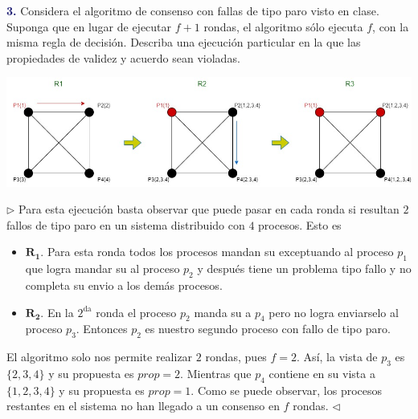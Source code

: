 \textbf{\textcolor{MidnightBlue}{3.}} Considera el algoritmo de consenso con
fallas de tipo paro visto en clase. Suponga que en lugar de ejecutar $f + 1$
rondas, el algoritmo sólo ejecuta $f$, con la misma regla de decisión. Describa
una ejecución particular en la que las propiedades de validez y acuerdo sean violadas.
\newline

\begin{center}
    \includegraphics[scale=0.5]{Consenso.jpeg}
    \end{center}

$\rhd$ Para esta ejecución basta observar que puede pasar en cada
ronda si resultan $2$ fallos de tipo paro en un sistema distribuido
con $4$ procesos. Esto es
\begin{itemize}
\item $\mathbf{R_1}.$ Para esta ronda todos los procesos mandan su 
      exceptuando al proceso $p_1$ que logra mandar su  al proceso
      $p_2$ y después tiene un problema tipo fallo y no completa su envio a
      los demás procesos.
\item $\mathbf{R_2.}$ En la $2^{\text{da}}$ ronda el proceso $p_2$ manda su
       a $p_4$ pero no logra enviarselo al proceso $p_3$. Entonces
      $p_2$ es nuestro segundo proceso con fallo de tipo paro.
\end{itemize}
El algoritmo solo nos permite realizar $2$ rondas, pues $f = 2$. Así,
la vista de $p_3$ es $\{2, 3, 4\}$ y su propuesta es $prop = 2$. Mientras
que $p_4$ contiene en su vista a $\{1, 2, 3, 4\}$ y su propuesta es
$prop = 1$. Como se puede observar, los procesos restantes en el sistema
no han llegado a un consenso en $f$ rondas.
\hfill $\lhd$
